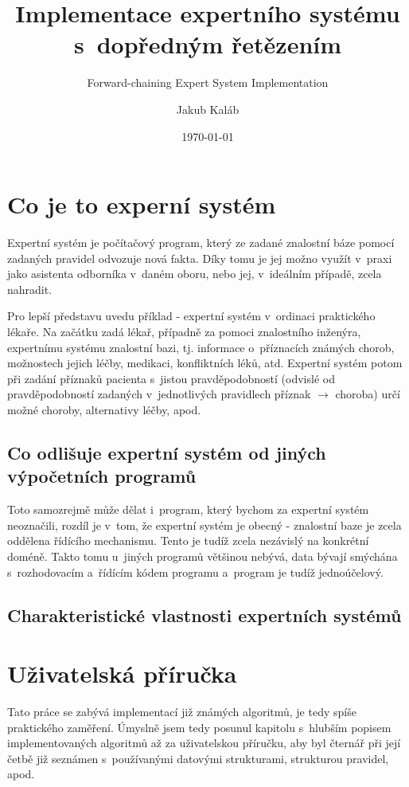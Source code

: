\documentclass[a4paper,12pt]{article}
\title{Implementace expertního systému s~dopředným řetězením}
\subtitle{Forward-chaining Expert System Implementation}
\author{Jakub Kaláb}
\date{\today}
\begin{document}
\maketitle

\section{Co je to experní systém}
Expertní systém je počítačový program, který ze zadané znalostní báze pomocí
zadaných pravidel odvozuje nová fakta. Díky tomu je jej možno využít v~praxi
jako asistenta odborníka v~daném oboru, nebo jej, v~ideálním případě, zcela
nahradit.

Pro lepší představu uvedu příklad - expertní systém v~ordinaci
praktického lékaře. Na začátku zadá lékař, případně za pomoci znalostního
inženýra, expertnímu systému znalostní bazi, tj. informace o~příznacích
známých chorob, možnostech jejich léčby, medikaci, konfliktních léků, atd.
Expertní systém potom při zadání příznaků pacienta s~jistou pravděpodobností
(odvislé od pravděpodobností zadaných v~jednotlivých pravidlech příznak
$\rightarrow$ choroba) určí možné choroby, alternativy léčby, apod.

\subsection{Co odlišuje expertní systém od jiných výpočetních programů}
Toto samozrejmě může dělat i~program, který bychom za expertní systém
neoznačili, rozdíl je v~tom, že expertní systém je obecný - znalostní
baze je zcela oddělena řídícího mechanismu. Tento je tudíž zcela
nezávislý na konkrétní doméně. Takto tomu u~jiných programů většinou
nebývá, data bývají smýchána s~rozhodovacím a~řídícím kódem programu
a~program je tudíž jednoúčelový.

\subsection{Charakteristické vlastnosti expertních systémů}

\newpage

\section{Uživatelská příručka}
Tato práce se zabývá implementací již známých algoritmů, je tedy spíše
praktického zaměření. Úmyslně jsem tedy posunul kapitolu s~hlubším popisem
implementovaných algoritmů až za uživatelskou příručku, aby byl čternář při
její četbě již seznámen s~používanými datovými strukturami, strukturou
pravidel, apod.
\end{document}
